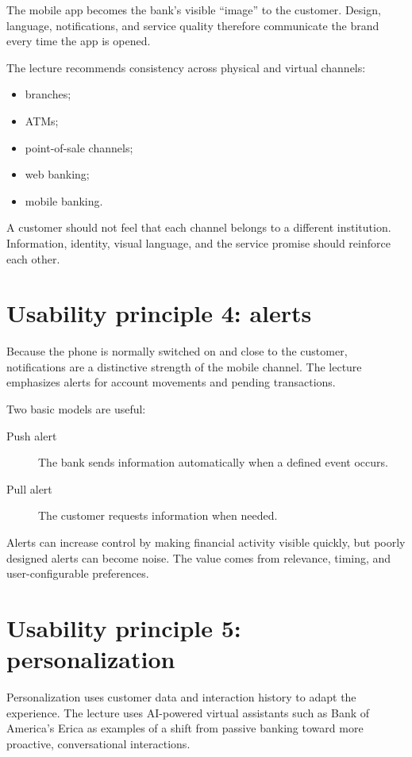 The mobile app becomes the bank's visible ``image'' to the customer. Design, language, notifications, and service quality therefore communicate the brand every time the app is opened.

The lecture recommends consistency across physical and virtual channels:

\begin{itemize}
  \item branches;
  \item ATMs;
  \item point-of-sale channels;
  \item web banking;
  \item mobile banking.
\end{itemize}

A customer should not feel that each channel belongs to a different institution. Information, identity, visual language, and the service promise should reinforce each other.

\section{Usability principle 4: alerts}

Because the phone is normally switched on and close to the customer, notifications are a distinctive strength of the mobile channel. The lecture emphasizes alerts for account movements and pending transactions.

Two basic models are useful:

\begin{description}
  \item[Push alert] The bank sends information automatically when a defined event occurs.
  \item[Pull alert] The customer requests information when needed.
\end{description}

Alerts can increase control by making financial activity visible quickly, but poorly designed alerts can become noise. The value comes from relevance, timing, and user-configurable preferences.

\section{Usability principle 5: personalization}

Personalization uses customer data and interaction history to adapt the experience. The lecture uses AI-powered virtual assistants such as Bank of America's Erica as examples of a shift from passive banking toward more proactive, conversational interactions.

